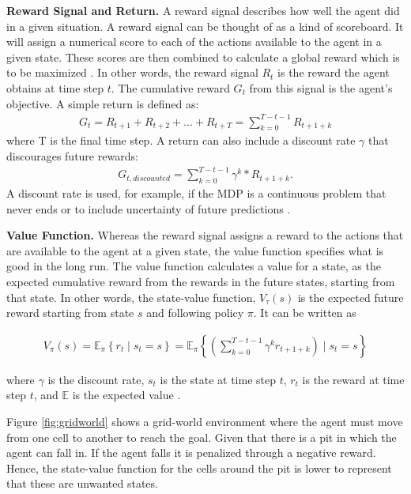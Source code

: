 
\textbf{Reward Signal and Return.}
A reward signal describes how well the agent did in a given situation. A reward signal can be thought of as a kind of scoreboard. It will assign a numerical score to each of the actions available to the agent in a given state. These scores are then combined to calculate a global reward which is to be maximized \cite{sutton2018reinforcement}.
In other words, the reward signal $R_t$ is the reward the agent obtains at time step $t$. The cumulative reward $G_t$ from this signal is the agent's objective. A simple return is defined as:
\begin{align*}
    G_t = R_{t+1} + R_{t+2} + ... + R_{t+T} = \sum_{k=0}^{T-t-1} R_{t+1+k}
\end{align*}
where T is the final time step. A return can also include a discount rate $\gamma$ that discourages future rewards:
\begin{align*}
    G_{t,discounted} = \sum_{k=0}^{T-t-1} \gamma^k * R_{t+1+k}.
\end{align*}
A discount rate is used, for example, if the MDP is a continuous problem that never ends or to include uncertainty of future predictions \cite{sutton2018reinforcement}.

\textbf{Value Function.}
Whereas the reward signal assigns a reward to the actions that are available to the agent at a given state, the value function specifies what is good in the long run. The value function calculates a value for a state, as the expected cumulative reward from the rewards in the future states, starting from that state. \cite{sutton2018reinforcement}
In other words, the state-value function, $V_{\tau}(s)$ is the expected future reward starting from state $s$ and following policy $\pi$. It can be written as

\begin{align*}
   V_{\pi}(s)=\mathbb{E}_{\pi}\left\{r_{t} \mid s_{t}=s\right\}=\mathbb{E}_{\pi}\left\{\left(\sum_{k=0}^{T-t-1} \gamma^{k} r_{t+1+k}\right) \mid s_{t}=s\right\}
\end{align*}
 
where $\gamma$ is the discount rate, $s_t$ is the state at time step $t$, $r_t$ is the reward at time step $t$, and $\mathbb{E}$ is the expected value \cite{eriksson2021deep}. 

Figure \ref{fig:gridworld} shows a grid-world environment where the agent must move from one cell to another to reach the goal. Given that there is a pit in which the agent can fall in. If the agent falls it is penalized through a negative reward. Hence, the state-value function for the cells around the pit is lower to represent that these are unwanted states.

